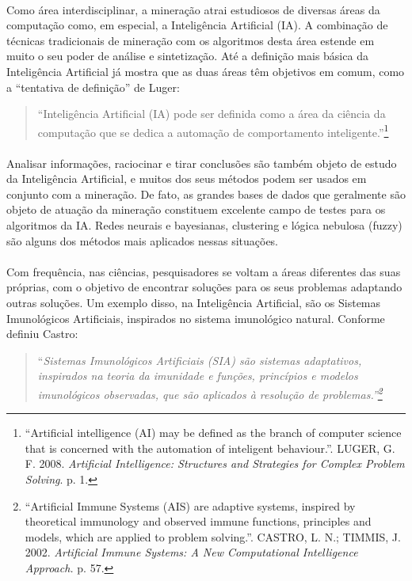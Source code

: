\documentclass{article}
\begin{document}
\paragraph{}Como área interdisciplinar, a mineração atrai estudiosos de diversas áreas da computação como, em especial, a Inteligência Artificial (IA). A combinação de técnicas tradicionais de mineração com os algoritmos desta área estende em muito o seu poder de análise e sintetização. Até a definição mais básica da Inteligência Artificial já mostra que as duas áreas têm objetivos em comum, como a ``tentativa de definição'' de Luger:

\begin{quote}
``Inteligência Artificial (IA) pode ser definida como a área da ciência da computação que se dedica a automação de comportamento inteligente.''\footnote{``Artificial intelligence (AI) may be defined as the branch of computer science that is concerned with the automation of inteligent behaviour.''. LUGER, G. F. 2008. \emph{Artificial Intelligence: Structures and Strategies for Complex Problem Solving}. p. 1.}
\end{quote}

\paragraph{}Analisar informações, raciocinar e tirar conclusões são também objeto de estudo da Inteligência Artificial, e muitos dos seus métodos podem ser usados em conjunto com a mineração. De fato, as grandes bases de dados que geralmente são objeto de atuação da mineração constituem excelente campo de testes para os algoritmos da IA. Redes neurais e bayesianas, clustering e lógica nebulosa (fuzzy) são alguns dos métodos mais aplicados nessas situações.

\paragraph{}Com frequência, nas ciências, pesquisadores se voltam a áreas diferentes das suas próprias, com o objetivo de encontrar soluções para os seus problemas adaptando outras soluções. Um exemplo disso, na Inteligência Artificial, são os Sistemas Imunológicos Artificiais, inspirados no sistema imunológico natural. Conforme definiu Castro:

\begin{quote}
``\emph{Sistemas Imunológicos Artificiais (SIA) são sistemas adaptativos, inspirados na teoria da imunidade e funções, princípios e modelos imunológicos observadas, que são aplicados à resolução de problemas.''\footnote{``Artificial Immune Systems (AIS) are adaptive systems, inspired by theoretical immunology and observed immune functions, principles and models, which are applied to problem solving.''. CASTRO, L. N.; TIMMIS, J. 2002. \emph{Artificial Immune Systems: A New Computational Intelligence Approach.} p. 57.}}
\end{quote}
\end{document}

